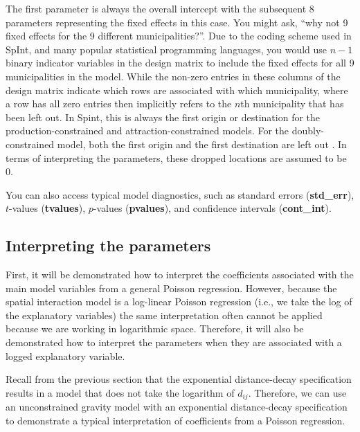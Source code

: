 \documentclass[11pt]{article}
\begin{document}
    The first parameter is always the overall intercept with the subsequent
8 parameters representing the fixed effects in this case. You might ask,
``why not 9 fixed effects for the 9 different municipalities?''. Due to
the coding scheme used in SpInt, and many popular statistical
programming languages, you would use \(n - 1\) binary indicator
variables in the design matrix to include the fixed effects for all 9
municipalities in the model. While the non-zero entries in these columns
of the design matrix indicate which rows are associated with which
municipality, where a row has all zero entries then implicitly refers
to the \(n\)th municipality that has been left out. In Spint, this is
always the first origin or destination for the production-constrained
and attraction-constrained models. For the doubly-constrained model,
both the first origin and the first destination are left out
\citep{tiefelsdorf_specification_1995}. In terms of interpreting the parameters,
these dropped locations are assumed to be 0. 

You can also access typical model diagnostics, such as standard errors (\textbf{std\_err}), $t$-values (\textbf{tvalues}), $p$-values (\textbf{pvalues}), and confidence intervals (\textbf{cont\_int}).


    \subsection{Interpreting the
parameters}\label{interpretting-the-parameters}

    First, it will be demonstrated how to interpret the coefficients
associated with the main model variables from a general Poisson
regression. However, because the spatial interaction model is a
log-linear Poisson regression (i.e., we take the log of the explanatory
variables) the same interpretation often cannot be applied because we are
working in logarithmic space. Therefore, it will also be demonstrated
how to interpret the parameters when they are associated with a logged
explanatory variable.

Recall from the previous section that the exponential distance-decay
specification results in a model that does not take the logarithm of
\(d_{ij}\). Therefore, we can use an unconstrained gravity model with an
exponential distance-decay specification to demonstrate a typical
interpretation of coefficients from a Poisson regression.
\end{document}
